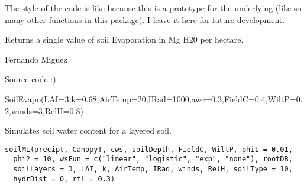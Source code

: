 \documentclass[letterpaper]{book}
\begin{document}
%
\begin{Details}\relax
The style of the code is  like because this is a
prototype for the underlying  (like so many other
functions in this package). I leave it here for future
development.
\end{Details}
%
\begin{Value}
Returns a single value of soil Evaporation in Mg H20 per
hectare.
\end{Value}
%
\begin{Author}\relax
Fernando Miguez
\end{Author}
%
\begin{SeeAlso}\relax
Source code :)
\end{SeeAlso}
%
\begin{Examples}
\begin{ExampleCode}
SoilEvapo(LAI=3,k=0.68,AirTemp=20,IRad=1000,awc=0.3,FieldC=0.4,WiltP=0.2,winds=3,RelH=0.8)
\end{ExampleCode}
\end{Examples}
%
\begin{Description}\relax
Simulates soil water content for a layered soil.
\end{Description}
%
\begin{Usage}
\begin{verbatim}
soilML(precipt, CanopyT, cws, soilDepth, FieldC, WiltP, phi1 = 0.01,
  phi2 = 10, wsFun = c("linear", "logistic", "exp", "none"), rootDB,
  soilLayers = 3, LAI, k, AirTemp, IRad, winds, RelH, soilType = 10,
  hydrDist = 0, rfl = 0.3)
\end{verbatim}
\end{Usage}
%
\end{document}
